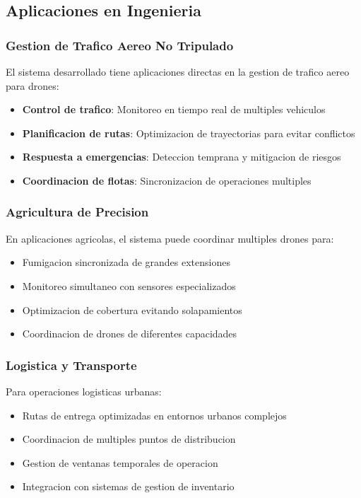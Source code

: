 \documentclass[12pt,a4paper]{article}
\begin{document}
\subsection{Aplicaciones en Ingenieria}

\subsubsection{Gestion de Trafico Aereo No Tripulado}

El sistema desarrollado tiene aplicaciones directas en la gestion de trafico aereo para drones:

\begin{itemize}
    \item \textbf{Control de trafico}: Monitoreo en tiempo real de multiples vehiculos
    \item \textbf{Planificacion de rutas}: Optimizacion de trayectorias para evitar conflictos
    \item \textbf{Respuesta a emergencias}: Deteccion temprana y mitigacion de riesgos
    \item \textbf{Coordinacion de flotas}: Sincronizacion de operaciones multiples
\end{itemize}

\subsubsection{Agricultura de Precision}

En aplicaciones agricolas, el sistema puede coordinar multiples drones para:

\begin{itemize}
    \item Fumigacion sincronizada de grandes extensiones
    \item Monitoreo simultaneo con sensores especializados
    \item Optimizacion de cobertura evitando solapamientos
    \item Coordinacion de drones de diferentes capacidades
\end{itemize}

\subsubsection{Logistica y Transporte}

Para operaciones logisticas urbanas:

\begin{itemize}
    \item Rutas de entrega optimizadas en entornos urbanos complejos
    \item Coordinacion de multiples puntos de distribucion
    \item Gestion de ventanas temporales de operacion
    \item Integracion con sistemas de gestion de inventario
\end{itemize}
\end{document}
